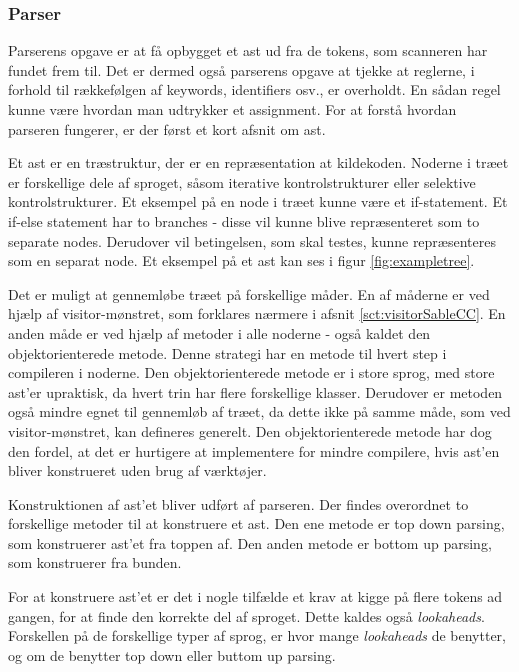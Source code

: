 \subsubsection{Parser}
Parserens opgave er at få opbygget et \gls{ast} ud fra de tokens, som scanneren har fundet frem til. Det er dermed også parserens opgave at tjekke at reglerne, i forhold til rækkefølgen af keywords, identifiers osv., er overholdt. En sådan regel kunne være hvordan man udtrykker et assignment. For at forstå hvordan parseren fungerer, er der først et kort afsnit om \gls{ast}.

Et \gls{ast} er en træstruktur, der er en repræsentation at kildekoden. Noderne i træet er forskellige dele af sproget, såsom iterative kontrolstrukturer eller selektive kontrolstrukturer. Et eksempel på en node i træet kunne være et if-statement. Et if-else statement har to branches - disse vil kunne blive repræsenteret som to separate nodes. Derudover vil betingelsen, som skal testes, kunne repræsenteres som en separat node. Et eksempel på et \gls{ast} kan ses i figur \ref{fig:exampletree}.


\noindent Det er muligt at gennemløbe træet på forskellige måder. En af måderne er ved hjælp af visitor-mønstret, som forklares nærmere i afsnit \ref{sct:visitorSableCC}. En anden måde er ved hjælp af metoder i alle noderne - også kaldet den objektorienterede metode. Denne strategi har en metode til hvert step i compileren i noderne. Den objektorienterede metode er i store sprog, med store \gls{ast}'er upraktisk, da hvert trin har flere forskellige klasser. Derudover er metoden også mindre egnet til gennemløb af træet, da dette ikke på samme måde, som ved visitor-mønstret, kan defineres generelt. Den objektorienterede metode har dog den fordel, at det er hurtigere at implementere for mindre compilere, hvis \gls{ast}'en bliver konstrueret uden brug af værktøjer.

Konstruktionen af \gls{ast}'et bliver udført af parseren. Der findes overordnet to forskellige metoder til at konstruere et \gls{ast}. Den ene metode er top down parsing, som konstruerer \gls{ast}'et fra toppen af. Den anden metode er bottom up parsing, som konstruerer fra bunden.

For at konstruere \gls{ast}'et er det i nogle tilfælde et krav at kigge på flere tokens ad gangen, for at finde den korrekte del af sproget. Dette kaldes også \textit{lookaheads}. Forskellen på de forskellige typer af sprog, er hvor mange \textit{lookaheads} de benytter, og om de benytter top down eller buttom up parsing.

